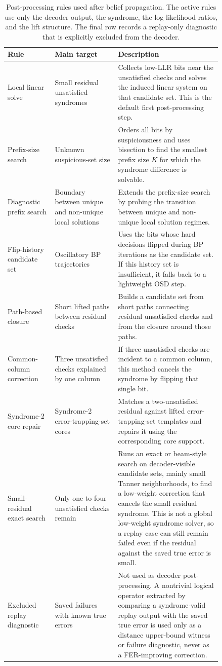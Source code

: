 \documentclass[11pt,a4paper]{article}
\theoremstyle{uprighttheorem}
\begin{document}
\begin{table}[H]
\centering
\small
\caption{Post-processing rules used after belief propagation. The active rules use only the decoder output, the syndrome, the log-likelihood ratios, and the lift structure. The final row records a replay-only diagnostic that is explicitly excluded from the decoder.}
\label{tab:pp-algorithms}
\begin{tabular}{L{0.18\linewidth} L{0.25\linewidth} L{0.41\linewidth}}
\toprule
Rule & Main target & Description \\
\midrule
Local linear solve &
Small residual unsatisfied syndromes &
Collects low-LLR bits near the unsatisfied checks and solves the induced linear system on that candidate set. This is the default first post-processing step. \\
Prefix-size search &
Unknown suspicious-set size &
Orders all bits by suspiciousness and uses bisection to find the smallest prefix size $K$ for which the syndrome difference is solvable. \\
Diagnostic prefix search &
Boundary between unique and non-unique local solutions &
Extends the prefix-size search by probing the transition between unique and non-unique local solution regimes. \\
Flip-history candidate set &
Oscillatory BP trajectories &
Uses the bits whose hard decisions flipped during BP iterations as the candidate set. If this history set is insufficient, it falls back to a lightweight OSD step. \\
Path-based closure &
Short lifted paths between residual checks &
Builds a candidate set from short paths connecting residual unsatisfied checks and from the closure around those paths. \\
Common-column correction &
Three unsatisfied checks explained by one column &
If three unsatisfied checks are incident to a common column, this method cancels the syndrome by flipping that single bit. \\
Syndrome-2 core repair &
Syndrome-2 error-trapping-set cores &
Matches a two-unsatisfied residual against lifted error-trapping-set templates and repairs it using the corresponding core support. \\
Small-residual exact search &
Only one to four unsatisfied checks remain &
Runs an exact or beam-style search on decoder-visible candidate sets, mainly small Tanner neighborhoods, to find a low-weight correction that cancels the small residual syndrome.  This is not a global low-weight syndrome solver, so a replay case can still remain failed even if the residual against the saved true error is small. \\
Excluded replay diagnostic &
Saved failures with known true errors &
Not used as decoder post-processing.  A nontrivial logical operator extracted by comparing a syndrome-valid replay output with the saved true error is used only as a distance upper-bound witness or failure diagnostic, never as a FER-improving correction. \\
\bottomrule
\end{tabular}
\end{table}
\end{document}
